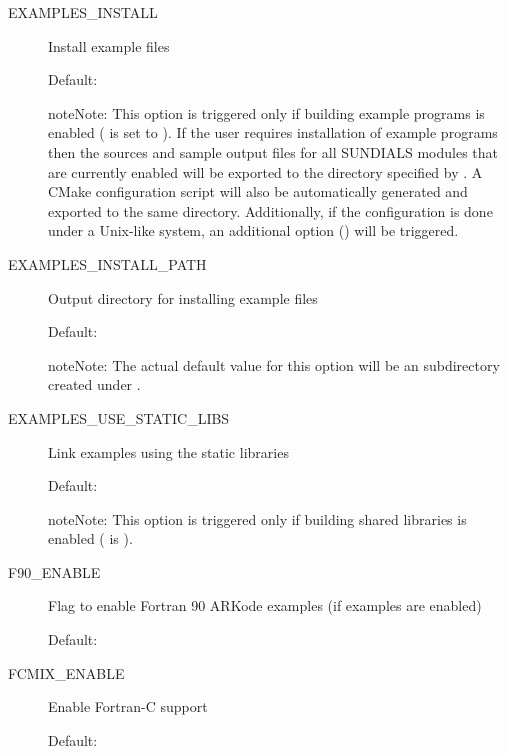 \documentclass[letterpaper,10pt,english]{sphinxmanual}
\begin{document}
\begin{description}
\item[{EXAMPLES\_INSTALL}] \leavevmode
Install example files

Default: 

\begin{notice}{note}{Note:}
This option is triggered only if building example programs is
enabled ( is set to ). If the user
requires installation of example programs then the sources and
sample output files for all SUNDIALS modules that are currently
enabled will be exported to the directory specified by
. A CMake configuration script will also
be automatically generated and exported to the same
directory. Additionally, if the configuration is done under a
Unix-like system, an additional option
() will be triggered.
\end{notice}

\item[{EXAMPLES\_INSTALL\_PATH}] \leavevmode
Output directory for installing example
files

Default: 

\begin{notice}{note}{Note:}
The actual default value for this option will be an
 subdirectory created under .
\end{notice}

\item[{EXAMPLES\_USE\_STATIC\_LIBS}] \leavevmode
Link examples using the static libraries

Default: 

\begin{notice}{note}{Note:}
This option is triggered only if building shared libraries is
enabled ( is ).
\end{notice}

\item[{F90\_ENABLE}] \leavevmode
Flag to enable Fortran 90 ARKode examples (if examples are enabled)

Default: 

\item[{FCMIX\_ENABLE}] \leavevmode
Enable Fortran-C support

Default: 


\end{description}
\end{document}
